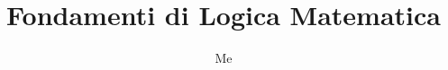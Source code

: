 \documentclass[fontsize = 11 pt, paper=A4, oneside, index=totoc, hyperref]{article}
\begin{document}
\title{Fondamenti di Logica Matematica}
\author{Me}

\maketitle
\tableofcontents
\pagebreak




\end{document}
